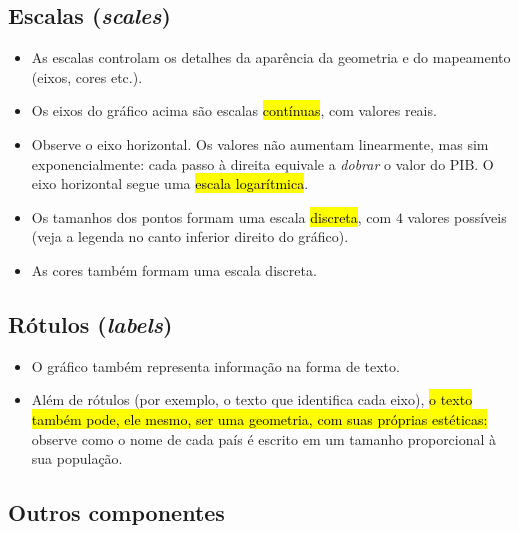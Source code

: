 \documentclass[
  11pt]{report}
\begin{document}
\hypertarget{escalas-scales}{%
\subsection{\texorpdfstring{Escalas (\emph{scales})}{Escalas (scales)}}\label{escalas-scales}}

\begin{itemize}
\item
  As escalas controlam os detalhes da aparência da geometria e do mapeamento (eixos, cores etc.).
\item
  Os eixos do gráfico acima são escalas {\hl{contínuas}}, com valores reais.
\item
  Observe o eixo horizontal. Os valores não aumentam linearmente, mas sim exponencialmente: cada passo à direita equivale a \emph{dobrar} o valor do PIB. O eixo horizontal segue uma {\hl{escala logarítmica}}.
\item
  Os tamanhos dos pontos formam uma escala {\hl{discreta}}, com \(4\) valores possíveis (veja a legenda no canto inferior direito do gráfico).
\item
  As cores também formam uma escala discreta.
\end{itemize}

\hypertarget{ruxf3tulos-labels}{%
\subsection{\texorpdfstring{Rótulos (\emph{labels})}{Rótulos (labels)}}\label{ruxf3tulos-labels}}

\begin{itemize}
\item
  O gráfico também representa informação na forma de texto.
\item
  Além de rótulos (por exemplo, o texto que identifica cada eixo), {\hl{o texto também pode, ele mesmo, ser uma geometria, com suas próprias estéticas:}} observe como o nome de cada país é escrito em um tamanho proporcional à sua população.
\end{itemize}

\hypertarget{outros-componentes}{%
\subsection{Outros componentes}\label{outros-componentes}}
\end{document}

